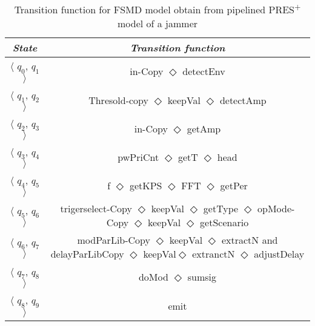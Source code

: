 \documentclass[9pt,executive]{article}
\def\presp{PRES\textsuperscript{+}}
\def\fsmd{FSMD}
\def\presp{PRES\textsuperscript{+}}
\def\fsmd{FSMD}
\begin{document}
\begin{table}[t]
  \begin{center}
    \small

\begin{tabular}{|c|c|} \hline 
\emph{State}                           & \emph{Transition function}              \\
              
\hline
$\langle$ $q_0$, $q_1$ $\rangle$         &  in-Copy $\Diamond$ detectEnv                                                                          \\ 
 \hline                                              
$\langle$ $q_1$, $q_2$ $\rangle$         &  Thresold-copy $\Diamond$ keepVal $\Diamond$ detectAmp                                                                 \\ 
\hline
$\langle$ $q_2$, $q_3$ $\rangle$         &   in-Copy $\Diamond$ getAmp                                                                                   \\  
\hline
$\langle$ $q_3$, $q_4$ $\rangle$         &  pwPriCnt $\Diamond$ getT $\Diamond$ head                                                                                \\    
\hline
$\langle$ $q_4$, $q_5$ $\rangle$         &  f $\Diamond$ getKPS $\Diamond$ FFT $\Diamond$ getPer                                                                              \\             
\hline
$\langle$ $q_5$, $q_6$ $\rangle$         &trigerselect-Copy $\Diamond$ keepVal $\Diamond$ getType $\Diamond$ opMode-Copy $\Diamond$ keepVal $\Diamond$ getScenario                            \\ 
\hline
$\langle$ $q_6$, $q_7$ $\rangle$         &modParLib-Copy $\Diamond$ keepVal $\Diamond$ extractN  and delayParLibCopy $\Diamond$ keepVal$\Diamond$ extranctN $\Diamond$ adjustDelay         \\ 
\hline
$\langle$ $q_7$, $q_8$ $\rangle$         &  doMod $\Diamond$ sumsig                                                                                                       \\
\hline 
$\langle$ $q_8$, $q_9$ $\rangle$         & emit \\
\hline
\end{tabular}
\end{center}
\caption{Transition function for {\fsmd} model obtain from pipelined {\presp} model of a jammer}
\label{F:comp3}
\end{table}
\clearpage
\end{document}
